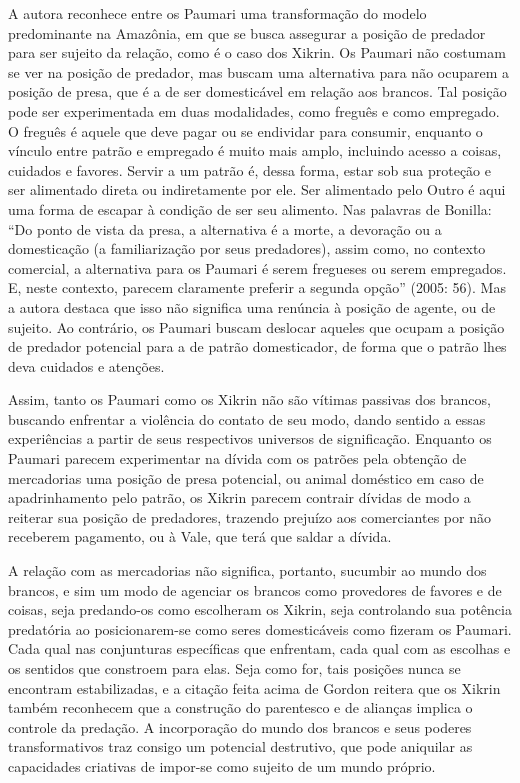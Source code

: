 A autora reconhece entre os Paumari uma transformação do modelo
predominante na Amazônia, em que se busca assegurar a posição de
predador para ser sujeito da relação, como é o caso dos Xikrin. Os
Paumari não costumam se ver na posição de predador, mas buscam uma
alternativa para não ocuparem a posição de presa, que é a de ser
domesticável em relação aos brancos. Tal posição pode ser experimentada
em duas modalidades, como freguês e como empregado. O freguês é aquele
que deve pagar ou se endividar para consumir, enquanto o vínculo entre
patrão e empregado é muito mais amplo, incluindo acesso a coisas,
cuidados e favores. Servir a um patrão é, dessa forma, estar sob sua proteção e
ser alimentado direta ou indiretamente por ele. Ser alimentado pelo
Outro é aqui uma forma de escapar à condição de ser seu alimento. Nas
palavras de Bonilla: ``Do ponto de vista da presa, a alternativa é a
morte, a devoração ou a domesticação (a familiarização por seus
predadores), assim como, no contexto comercial, a alternativa para os
Paumari é serem fregueses ou serem empregados. E, neste contexto,
parecem claramente preferir a segunda opção'' (2005: 56). Mas a autora
destaca que isso não significa uma renúncia à posição de agente, ou de
sujeito. Ao contrário, os Paumari buscam deslocar aqueles que ocupam a
posição de predador potencial para a de patrão domesticador, de forma
que o patrão lhes deva cuidados e atenções. 

Assim, tanto os Paumari como os Xikrin não são vítimas passivas dos
brancos, buscando enfrentar a violência do contato de seu modo, dando
sentido a essas experiências a partir de seus respectivos universos de
significação. Enquanto os Paumari parecem experimentar na dívida com os
patrões pela obtenção de mercadorias uma posição de presa potencial, ou
animal doméstico em caso de apadrinhamento pelo patrão, os Xikrin
parecem contrair dívidas de modo a reiterar sua posição de predadores,
trazendo prejuízo aos comerciantes por não receberem pagamento, ou à
Vale, que terá que saldar a dívida.

A relação com as mercadorias não significa, portanto, sucumbir ao mundo
dos brancos, e sim um modo de agenciar os brancos como provedores de
favores e de coisas, seja predando-os como escolheram os Xikrin, seja
controlando sua potência predatória ao posicionarem-se como seres
domesticáveis como fizeram os Paumari. Cada qual nas conjunturas
específicas que enfrentam, cada qual com as escolhas e os sentidos que
constroem para elas. Seja como for, tais posições nunca se encontram
estabilizadas, e a citação feita acima de Gordon reitera que os Xikrin
também reconhecem que a construção do parentesco e de alianças implica
o controle da predação. A incorporação do mundo dos brancos e seus
poderes transformativos traz consigo um potencial destrutivo, que pode
aniquilar as capacidades criativas de impor-se como sujeito de um mundo
próprio.

